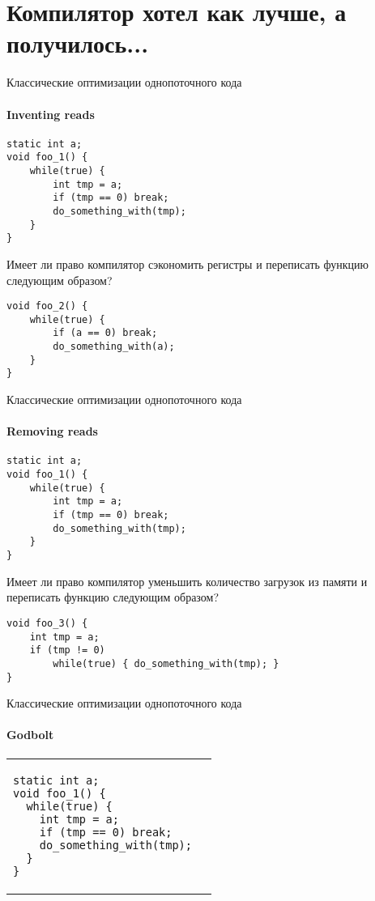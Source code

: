 
\section{Компилятор хотел как лучше, а получилось...}
\showTOC


\begin{frame}[t,fragile]{Классические оптимизации однопоточного кода}
\framesubtitle{Inventing reads}

\begin{verbatim}
static int a;
void foo_1() {
    while(true) {
        int tmp = a;
        if (tmp == 0) break;
        do_something_with(tmp);
    }
}
\end{verbatim}

\pause
Имеет ли право компилятор сэкономить регистры и переписать функцию следующим образом?

\begin{verbatim}
void foo_2() {
    while(true) {
        if (a == 0) break;
        do_something_with(a);
    }
}
\end{verbatim}

\end{frame}


\begin{frame}[t,fragile]{Классические оптимизации однопоточного кода}
\framesubtitle{Removing reads}

\begin{verbatim}
static int a;
void foo_1() {
    while(true) {
        int tmp = a;
        if (tmp == 0) break;
        do_something_with(tmp);
    }
}
\end{verbatim}

\pause

Имеет ли право компилятор уменьшить количество загрузок из памяти и переписать функцию следующим образом?

\begin{verbatim}
void foo_3() {
    int tmp = a;
    if (tmp != 0)
        while(true) { do_something_with(tmp); }
}
\end{verbatim}
\end{frame}




\begin{frame}[t, fragile]{Классические оптимизации однопоточного кода}
\framesubtitle{Godbolt}


\begin{tabular}{p{} p{}}


\begin{verbatim}
static int a;
void foo_1() {
  while(true) {
    int tmp = a;
    if (tmp == 0) break;
    do_something_with(tmp);
  }
}
\end{verbatim}

&

\end{tabular}
\end{frame}


